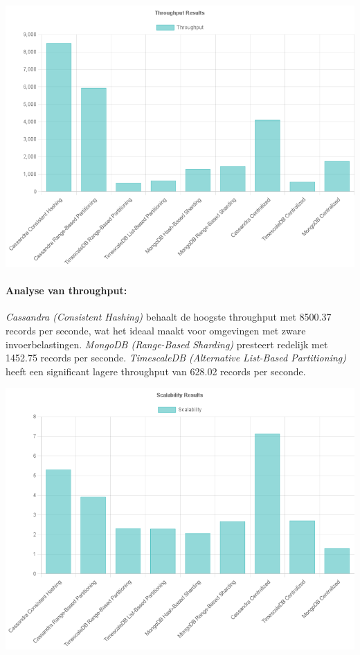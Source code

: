 \documentclass[a0,portrait]{hogent-poster}
\begin{document}
\begin{multicols}{2}
\begin{center}
  \captionsetup{type=figure}
  \includegraphics[width=0.75\linewidth]{Throughput.png}
\end{center}

\paragraph{Analyse van throughput:}
\textit{Cassandra (Consistent Hashing)} behaalt de hoogste throughput met 8500.37 records per seconde, wat het ideaal maakt voor omgevingen met zware invoerbelastingen. \textit{MongoDB (Range-Based Sharding)} presteert redelijk met 1452.75 records per seconde. \textit{TimescaleDB (Alternative List-Based Partitioning)} heeft een significant lagere throughput van 628.02 records per seconde.

\begin{center}
  \captionsetup{type=figure}
  \includegraphics[width=0.75\linewidth]{Scalability.png}
\end{center}


\end{multicols}
\end{document}
